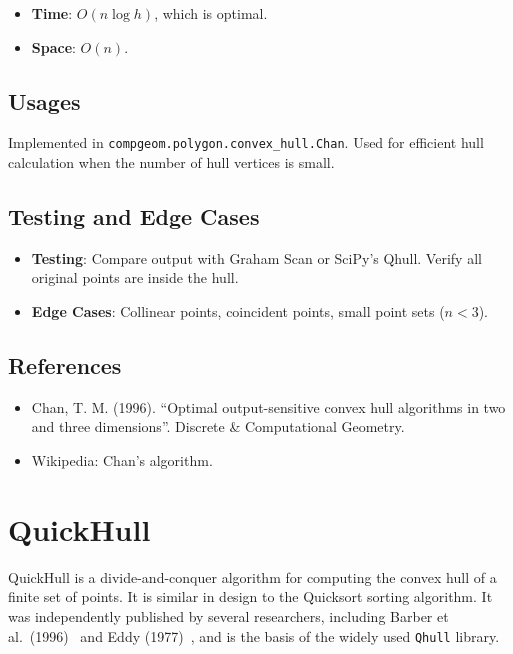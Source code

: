 \begin{itemize}
\item \textbf{Time}: $O(n \log h)$, which is optimal.
\item \textbf{Space}: $O(n)$.
\end{itemize}

\subsection{Usages}

Implemented in \texttt{compgeom.polygon.convex\_hull.Chan}. Used for efficient hull calculation when the number of hull vertices is small.

\subsection{Testing and Edge Cases}

\begin{itemize}
\item \textbf{Testing}: Compare output with Graham Scan or SciPy's Qhull. Verify all original points are inside the hull.
\item \textbf{Edge Cases}: Collinear points, coincident points, small point sets ($n < 3$).
\end{itemize}

\subsection{References}

\begin{itemize}
\item Chan, T. M. (1996). ``Optimal output-sensitive convex hull algorithms in two and three dimensions''. Discrete \& Computational Geometry.
\item Wikipedia: Chan's algorithm.
\end{itemize}


\section{QuickHull}
\label{sec:quickhull}

QuickHull is a divide-and-conquer algorithm for computing the convex hull of a finite set of points. It is similar in design to the Quicksort sorting algorithm. It was independently published by several researchers, including Barber et al.\ (1996)~\cite{barber1996} and Eddy (1977)~\cite{eddy1977}, and is the basis of the widely used \texttt{Qhull} library.

